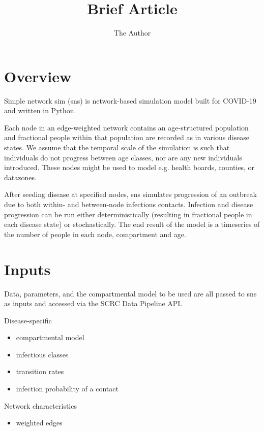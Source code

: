 \documentclass[11pt]{article}
\title{Brief Article}
\author{The Author}
\begin{document}
\section{Overview}

Simple network sim (sns) is network-based simulation model built for COVID-19 and written in Python.

Each node in an edge-weighted network contains an age-structured population and fractional people within that population are recorded as in various disease states. We assume that the temporal scale of the simulation is such that individuals do not progress between age classes, nor are any new individuals introduced. These nodes might be used to model e.g. health boards, counties, or datazones.  

After seeding disease at specified nodes, sns simulates progression of an outbreak due to both within- and between-node infectious contacts.  Infection and disease progression can be run either deterministically (resulting in fractional people in each disease state) or stochastically.  The end result of the model is a timeseries of the number of people in each
node, compartment and age.

\section{Inputs}

Data, parameters, and the compartmental model to be used are all passed to sns as inputs and accessed via the SCRC Data Pipeline API.  

Disease-specific
\begin{itemize}
\item compartmental model
\item infectious classes
\item transition rates
\item infection probability of a contact
\end{itemize}

Network characteristics
\begin{itemize}
\item weighted edges
\end{itemize}
\end{document}
